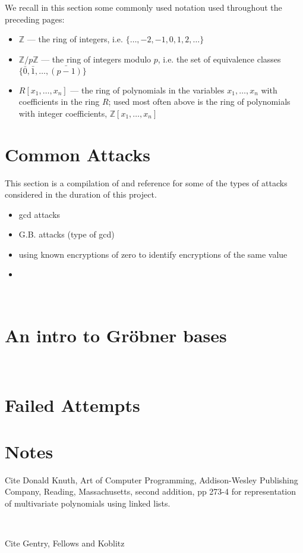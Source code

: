 \documentclass[11pt]{report}
\newcommand{\Z}{\mathbb{Z}}
\newcommand{\Zp}{\mathbb{Z}/p\mathbb{Z}}
\begin{document}
We recall in this section some commonly used notation used throughout the preceding pages:

\begin{itemize}
\item $\Z$ --- the ring of integers, i.e. $\{\dots,  -2, -1, 0, 1, 2, \dots\}$
\item $\Zp$ --- the ring of integers modulo $p$, i.e. the set of equivalence classes $\{\bar{0}, \bar{1}, \dots , \bar{(p-1)}\}$
\item $R[x_1, \dots ,x_n]$ --- the ring of polynomials in the variables $x_1,\dots, x_n$ with coefficients in the ring $R$; used most often above is the ring of polynomials with integer coefficients, $\Z[x_1,\dots,x_n]$
\end{itemize}

\section{Common Attacks}

This section is a compilation of and reference for some of the types of attacks considered in the duration of this project.

\begin{itemize}
\item gcd attacks
\item G.B. attacks (type of gcd)
\item using known encryptions of zero to identify encryptions of the same value
\item
\end{itemize}

\

\section{An intro to Gr\"obner bases}

\

\section{Failed Attempts}

\section{Notes}
Cite Donald Knuth, Art of Computer Programming, Addison-Wesley Publishing Company, Reading, Massachusetts, second addition, pp 273-4 for representation of multivariate polynomials using linked lists.

\

Cite Gentry, Fellows and Koblitz
\end{document}

